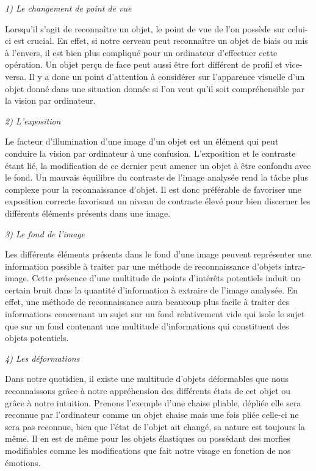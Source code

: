 \documentclass[a4paper,12pt]{article} %
\begin{document}
\textit{1)	Le changement de point de vue} \newline

Lorsqu’il s’agit de reconnaître un objet, le point de vue de l’on possède sur celui-ci est crucial. En effet, si notre cerveau peut reconnaître un objet de biais ou mis à l’envers, il est bien plus compliqué pour un ordinateur d’effectuer cette opération. Un objet perçu de face peut aussi être fort différent de profil et vice-versa. Il y a donc un point d’attention à considérer sur l’apparence visuelle d’un objet donné dans une situation donnée si l'on veut qu'il soit compréhensible par la vision par ordinateur.\newline

\textit{2)	L’exposition}\newline

Le facteur d’illumination d’une image d’un objet est un élément qui peut conduire la vision par ordinateur à une confusion. L’exposition et le contraste étant lié, la modification de ce dernier peut amener un objet à être confondu avec le fond. Un mauvais équilibre du contraste de l'image analysée rend la tâche plus complexe pour la reconnaissance d'objet. Il est donc préférable de favoriser une exposition correcte favorisant un niveau de contraste élevé pour bien discerner les différents éléments présents dans une image. \newline

\textit{3)	Le fond de l’image }\newline

Les différents éléments présents dans le fond d’une image peuvent représenter une information possible à traiter par une méthode de reconnaissance d’objets intra-image. Cette présence d'une multitude de points d'intérêts potentiels induit un certain bruit dans la quantité d'information à extraire de l'image analysée. En effet, une méthode de reconnaissance aura beaucoup plus facile à traiter des informations concernant un sujet sur un fond relativement vide qui isole le sujet que sur un fond contenant une multitude d’informations qui constituent des objets potentiels.\newline

\textit{4)	Les déformations} \newline

Dans notre quotidien, il existe une multitude d’objets déformables que nous reconnaissons grâce à notre appréhension des différents états de cet objet ou grâce à notre intuition. Prenons l’exemple d’une chaise pliable, dépliée elle sera reconnue par l’ordinateur comme un objet chaise mais une fois pliée celle-ci ne sera pas reconnue, bien que l’état de l’objet ait changé, sa nature est toujours la même. Il en est de même pour les objets élastiques ou possédant des morfies modifiables comme les modifications que fait notre visage en fonction de nos émotions.\newline
\end{document}
